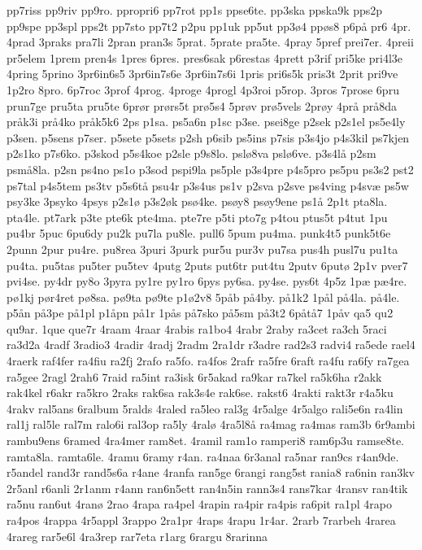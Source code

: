{pp7riss
pp9riv
pp9ro.
ppropri6
pp7rot
pp1s
ppse6te.
pp3ska
ppska9k
pps2p
pp9spe
pp3spl
pps2t
pp7sto
pp7t2
p2pu
pp1uk
pp5ut
pp3ø4
ppøs8
p6på
pr6
4pr.
4prad
3praks
pra7li
2pran
pran3s
5prat.
5prate
pra5te.
4pray
5pref
prei7er.
4preii
pr5elem
1prem
pren4s
1pres
6pres.
pres6sak
p6restas
4prett
p3rif
pri5ke
pri4l3e
4pring
5prino
3pr6in6s5
3pr6in7s6e
3pr6in7s6i
1pris
pri6s5k
pris3t
2prit
pri9ve
1p2ro
8pro.
6p7roc
3prof
4prog.
4proge
4progl
4p3roi
p5rop.
3pros
7prose
6pru
prun7ge
pru5ta
pru5te
6prør
prørs5t
prø5s4
5prøv
prø5vels
2prøy
4prå
prå8da
pråk3i
prå4ko
pråk5k6
2ps
p1sa.
ps5a6n
p1sc
p3se.
psei8ge
p2sek
p2s1el
ps5e4ly
p3sen.
p5sens
p7ser.
p5sete
p5sets
p2sh
p6sib
ps5ins
p7sis
p3s4jo
p4s3kil
ps7kjen
p2s1ko
p7s6ko.
p3skod
p5s4koe
p2sle
p9s8lo.
pslø8va
pslø6ve.
p3s4lå
p2sm
psmå8la.
p2sn
ps4no
ps1o
p3sod
pspi9la
ps5ple
p3s4pre
p4s5pro
ps5pu
ps3s2
pst2
ps7tal
p4s5tem
ps3tv
p5s6tå
psu4r
p3s4us
ps1v
p2sva
p2sve
ps4ving
p4svæ
ps5w
psy3ke
3psyko
4psys
p2s1ø
p3s2øk
psø4ke.
psøy8
psøy9ene
ps1å
2p1t
pta8la.
pta4le.
pt7ark
p3te
pte6k
pte4ma.
pte7re
p5ti
pto7g
p4tou
ptus5t
p4tut
1pu
pu4br
5puc
6pu6dy
pu2k
pu7la
pu8le.
pull6
5pum
pu4ma.
punk4t5
punk5t6e
2punn
2pur
pu4re.
pu8rea
3puri
3purk
pur5u
pur3v
pu7sa
pus4h
pusl7u
pu1ta
pu4ta.
pu5tas
pu5ter
pu5tev
4putg
2puts
put6tr
put4tu
2putv
6putø
2p1v
pver7
pvi4se.
py4dr
py8o
3pyra
py1re
py1ro
6pys
py6sa.
py4se.
pys6t
4p5z
1pæ
pæ4re.
pø1kj
pør4ret
pø8sa.
pø9ta
pø9te
p1ø2v8
5påb
på4by.
på1k2
1pål
på4la.
på4le.
p5ån
på3pe
på1pl
p1åpn
på1r
1pås
på7sko
på5sm
på3t2
6påtå7
1påv
qa5
qu2
qu9ar.
1que
que7r
4raam
4raar
4rabis
ra1bo4
4rabr
2raby
ra3cet
ra3ch
5raci
ra3d2a
4radf
3radio3
4radir
4radj
2radm
2ra1dr
r3adre
rad2s3
radvi4
ra5ede
rael4
4raerk
raf4fer
ra4fiu
ra2fj
2rafo
ra5fo.
ra4fos
2rafr
ra5fre
6raft
ra4fu
ra6fy
ra7gea
ra5gee
2ragl
2rah6
7raid
ra5int
ra3isk
6r5akad
ra9kar
ra7kel
ra5k6ha
r2akk
rak4kel
r6akr
ra5kro
2raks
rak6sa
rak3s4e
rak6se.
rakst6
4rakti
rakt3r
r4a5ku
4rakv
ral5ans
6ralbum
5ralds
4raled
ra5leo
ral3g
4r5alge
4r5algo
rali5e6n
ra4lin
ral1j
ral5le
ral7m
ralo6i
ral3op
ra5ly
4ralø
4ra5l8å
ra4mag
ra4mas
ram3b
6r9ambi
rambu9ens
6ramed
4ra4mer
ram8et.
4ramil
ram1o
ramperi8
ram6p3u
ramse8te.
ramta8la.
ramta6le.
4ramu
6ramy
r4an.
ra4naa
6r3anal
ra5nar
ran9cs
r4an9de.
r5andel
rand3r
rand5s6a
r4ane
4ranfa
ran5ge
6rangi
rang5st
rania8
ra6nin
ran3kv
2r5anl
r6anli
2r1anm
r4ann
ran6n5ett
ran4n5in
rann3s4
rans7kar
4ransv
ran4tik
ra5nu
ran6ut
4ranø
2rao
4rapa
ra4pel
4rapin
ra4pir
ra4pis
ra6pit
ra1pl
4rapo
ra4pos
4rappa
4r5appl
3rappo
2ra1pr
4raps
4rapu
1r4ar.
2rarb
7rarbeh
4rarea
4rareg
rar5e6l
4ra3rep
rar7eta
r1arg
6rargu
8rarinna
}
